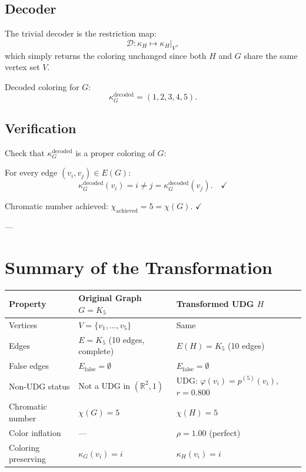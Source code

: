 \documentclass[11pt]{article}
\theoremstyle{definition}
\newcommand{\Real}{\mathbb{R}}
\newcommand{\Efalse}{E_{\mathrm{false}}}
\begin{document}
\subsection{Decoder}

The trivial decoder is the restriction map:
\[
\mathcal{D}: \kappa_H \mapsto \kappa_H|_V,
\]
which simply returns the coloring unchanged since both $H$ and $G$ share the same vertex set $V$.

Decoded coloring for $G$:
\[
\kappa_G^{\text{decoded}} = (1, 2, 3, 4, 5).
\]

\subsection{Verification}

Check that $\kappa_G^{\text{decoded}}$ is a proper coloring of $G$:

For every edge $(v_i, v_j) \in E(G)$:
\[
\kappa_G^{\text{decoded}}(v_i) = i \neq j = \kappa_G^{\text{decoded}}(v_j). \quad \checkmark
\]

Chromatic number achieved: $\chi_{\text{achieved}} = 5 = \chi(G)$. $\checkmark$

---

\section{Summary of the Transformation}

\begin{center}
\begin{tabular}{lll}
\toprule
Property & Original Graph $G = K_5$ & Transformed UDG $H$ \\
\midrule
Vertices & $V = \{v_1, \ldots, v_5\}$ & Same \\
Edges & $E = K_5$ (10 edges, complete) & $E(H) = K_5$ (10 edges) \\
False edges & $\Efalse = \emptyset$ & $\Efalse = \emptyset$ \\
Non-UDG status & Not a UDG in $(\Real^2, 1)$ & UDG: $\varphi(v_i) = p^{(5)}(v_i)$, $r = 0.800$ \\
Chromatic number & $\chi(G) = 5$ & $\chi(H) = 5$ \\
Color inflation & --- & $\rho = 1.00$ (perfect) \\
Coloring preserving & $\kappa_G(v_i) = i$ & $\kappa_H(v_i) = i$ \\
\bottomrule
\end{tabular}
\end{center}
\end{document}
